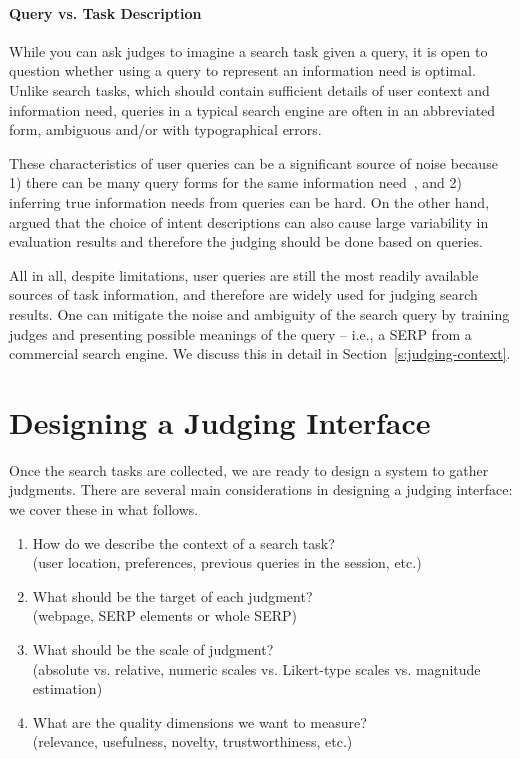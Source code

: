 \paragraph{Query vs. Task Description} While you can ask judges to imagine a search task given a query, it is open to question whether using a query to represent an information need is optimal. Unlike search tasks, which should contain sufficient details of user context and information need, queries in a typical search engine are often in an abbreviated form, ambiguous and/or with typographical errors. 

These characteristics of user queries can be a significant source of noise because 1) there can be many query forms for the same information need~\citep{Bailey:2015:UVI}, and 2) inferring true information needs from queries can be hard. On the other hand, \cite{Yilmaz:2014:EID} argued that the choice of intent descriptions can also cause large variability in evaluation results and therefore the judging should be done based on queries.

All in all, despite limitations, user queries are still the most readily available sources of task information, and therefore are widely used for judging search results. One can mitigate the noise and ambiguity of the search query by training judges and presenting possible meanings of the query -- i.e., a SERP from a commercial search engine. We discuss this in detail in Section~\ref{s:judging-context}.

\section{Designing a Judging Interface}

Once the search tasks are collected, we are ready to design a system to gather judgments. There are several main considerations in designing a judging interface: we cover these in what follows.

\begin{enumerate}
	\item  How do we describe the context of a search task? \\(user location, preferences, previous queries in the session, etc.)
	\item  What should be the target of each judgment? \\(webpage, SERP elements or whole SERP)
	\item  What should be the scale of judgment? \\(absolute vs. relative, numeric scales vs. Likert-type scales vs. magnitude estimation)	
	\item  What are the quality dimensions we want to measure? \\(relevance, usefulness, novelty, trustworthiness, etc.)
\end{enumerate}

